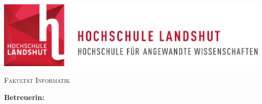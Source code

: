 
\thispagestyle{empty}

\begin{titlepage}

\vspace{3cm}

\begin{center}
	\includegraphics[scale=0.8]{0-Template/Logo.pdf}
\end{center}

\vspace{2.5cm}

\begin{center}
	\large \textsc{Fakultät Informatik}
\end{center}

\vspace{1cm}

\begin{center}
	\huge \textbf{\thesis}
\end{center}

\vspace{1cm}

\begin{center}
	\large \textsc{\batitle}
\end{center}

\vspace{1cm}

\begin{center}
	\large \vorname{} \name{}
\end{center}

\vspace{4cm}

\begin{center}
	\large
	\textbf{Betreuerin: }\babetreuer%
\end{center}

\end{titlepage}
